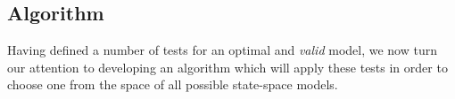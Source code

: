 \documentclass{article}
\begin{document}
\subsection{Algorithm} \label{algo}

Having defined a number of tests for an optimal and \textit{valid} model, we now turn our attention to developing an algorithm which will apply these tests in order to choose one from the space of all possible state-space models.

\begin{minipage}{\linewidth}
  \begin{algorithm}[H]
    \SetAlgoLined
    \DontPrintSemicolon
    
    \SetStartEndCondition{ }{}{}%
    \AlgoDontDisplayBlockMarkers
    \SetAlgoNoEnd


\end{algorithm}
\end{minipage}
\end{document}
